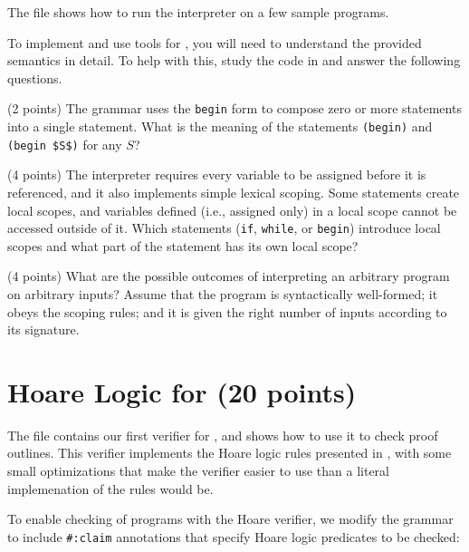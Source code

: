 \documentclass{handout}
\begin{document}
The file  shows how to run the \imp interpreter on a few
sample programs. 

To implement and use tools for \imp, you will need to understand the provided
semantics in detail. To help with this, study the code in 
and answer the following questions.

\begin{questions}
  \item (2 points) \label{prob:imp-first} The \imp grammar uses the
  \lstinline{begin} form to compose zero or more \imp statements into a single
  statement. What is the meaning of the statements \lstinline{(begin)} and
  \lstinline{(begin $S$)} for any $S$? 
  
  

  \item (4 points) The \imp interpreter requires every variable to be assigned
  before it is referenced, and it also implements simple lexical scoping. Some
  \imp statements create local scopes, and variables defined (i.e., assigned
  only) in a local scope cannot be accessed outside of it. Which \imp statements
  (\lstinline{if}, \lstinline{while}, or \lstinline{begin}) introduce local
  scopes and what part of the statement has its own local scope?
  
  

  \item (4 points) \label{prob:imp-last}  What are the possible outcomes of
  interpreting an arbitrary \imp program on arbitrary inputs? Assume that the
  program is syntactically well-formed; it obeys the \imp scoping rules; and it
  is given the right number of inputs according to its signature.  
  
  
\end{questions}

\section{Hoare Logic for \imp (20 points)}\label{sec:imp:hoare}

The file  contains our first verifier for \imp, and
 shows how to use it to check proof outlines. This
verifier implements the Hoare logic rules presented in , with some
small optimizations that make the verifier easier to use than a literal
implemenation of the rules would be. 

To enable checking of \imp programs with the Hoare verifier, we modify the \imp
grammar to include \lstinline{#:claim} annotations that specify Hoare logic
predicates to be checked:
\end{document}
